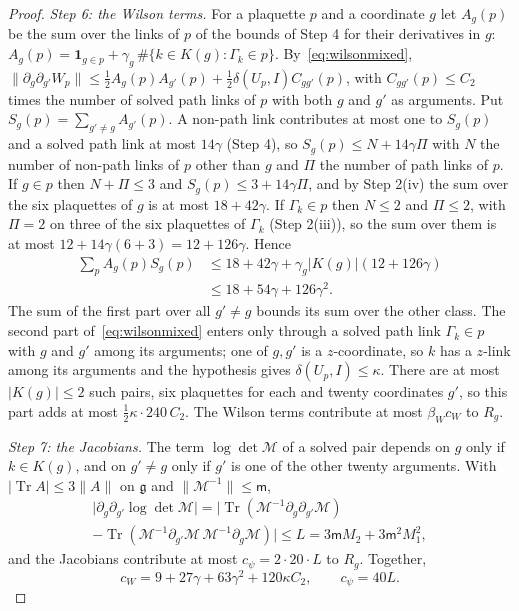 \documentclass[11pt]{amsart}
\theoremstyle{definition}
\theoremstyle{remark}
\numberwithin{equation}{section}
\newcommand{\g}{\mathfrak{g}}
\newcommand{\Tr}{\operatorname{Tr}}
\begin{document}
\begin{proof}
\emph{Step 6: the Wilson terms.} For a plaquette $p$ and a coordinate
$g$ let $A_g(p)$ be the sum over the links of $p$ of the bounds of Step 4
for their derivatives in $g$: $A_g(p)=\mathbf 1_{g\in p}+\gamma_g\,
\#\{k\in K(g):\Gamma_k\in p\}$. By~\eqref{eq:wilsonmixed},
$\lVert\partial_g\partial_{g'}W_p\rVert\le\frac12A_g(p)A_{g'}(p)+\frac12
\delta(U_p,I)C_{gg'}(p)$, with $C_{gg'}(p)\le C_2$ times the number of
solved path links of $p$ with both $g$ and $g'$ as arguments. Put
$S_g(p)=\sum_{g'\ne g}A_{g'}(p)$. A non-path link contributes at most one
to $S_g(p)$ and a solved path link at most $14\gamma$ (Step 4), so
$S_g(p)\le N+14\gamma\Pi$ with $N$ the number of non-path links of $p$
other than $g$ and $\Pi$ the number of path links of $p$. If $g\in p$
then $N+\Pi\le3$ and $S_g(p)\le3+14\gamma\Pi$, and by Step 2(iv) the sum
over the six plaquettes of $g$ is at most $18+42\gamma$. If
$\Gamma_k\in p$ then $N\le2$ and $\Pi\le2$, with $\Pi=2$ on three of the
six plaquettes of $\Gamma_k$ (Step 2(iii)), so the sum over them is at
most $12+14\gamma(6+3)=12+126\gamma$. Hence
\begin{align*}
\sum_p A_g(p)S_g(p)&\le18+42\gamma+\gamma_g\lvert K(g)\rvert
(12+126\gamma)\\
&\le18+54\gamma+126\gamma^2 .
\end{align*}
The sum of the first part over all $g'\ne g$ bounds its sum over the
other class. The second part of~\eqref{eq:wilsonmixed} enters only
through a solved path link $\Gamma_k\in p$ with $g$ and $g'$ among its
arguments; one of $g,g'$ is a $z$-coordinate, so $k$ has a $z$-link among
its arguments and the hypothesis gives $\delta(U_p,I)\le\kappa$. There are at most
$\lvert K(g)\rvert\le2$ such pairs, six plaquettes for each and twenty
coordinates $g'$, so this part adds at most $\frac12\kappa\cdot240\,C_2$.
The Wilson terms contribute at most $\beta_Wc_W$ to $R_g$.

\emph{Step 7: the Jacobians.} The term $\log\det\mathcal M$ of a solved
pair depends on $g$ only if $k\in K(g)$, and on $g'\ne g$ only if $g'$ is
one of the other twenty arguments. With $\lvert\Tr A\rvert\le3\lVert A
\rVert$ on $\g$ and $\lVert\mathcal M^{-1}\rVert\le\mathsf m$,
\begin{multline*}
\bigl\lvert\partial_g\partial_{g'}\log\det\mathcal M\bigr\rvert=
\bigl\lvert\Tr(\mathcal M^{-1}\partial_g\partial_{g'}\mathcal M)\\
-\Tr(\mathcal M^{-1}\partial_{g'}\mathcal M\,\mathcal M^{-1}\partial_g
\mathcal M)\bigr\rvert\le L=3\mathsf mM_2+3\mathsf m^2M_1^2,
\end{multline*}
and the Jacobians contribute at most $c_\psi=2\cdot20\cdot L$ to $R_g$.
Together,
\begin{equation}\label{eq:cwcpsi}
c_W=9+27\gamma+63\gamma^2+120\kappa C_2,\qquad c_\psi=40L .
\end{equation}


\end{proof}
\end{document}
